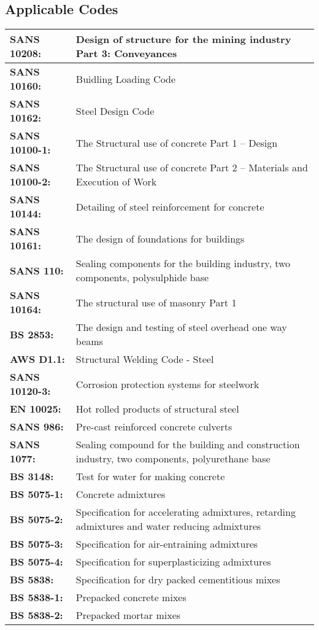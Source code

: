 \documentclass{article}%
\begin{document}
\subsection{Applicable Codes}%
\label{subsec:ApplicableCodes}%
\begin{flushleft}%
\begin{minipage}{\textwidth}%
\flushleft%
\begin{tabular}{|l |l |}%
\hline%
\textbf{SANS 10208:}&Design of structure for the mining industry Part 3: Conveyances\\%
\hline%
\textbf{SANS 10160:}&Buidling Loading Code\\%
\hline%
\textbf{SANS 10162:}&Steel Design Code\\%
\hline%
\textbf{SANS 10100{-}1:}&The Structural use of concrete Part 1 – Design\\%
\hline%
\textbf{SANS 10100{-}2:}&The Structural use of concrete Part 2 – Materials and Execution of Work\\%
\hline%
\textbf{SANS 10144:}&Detailing of steel reinforcement for concrete\\%
\hline%
\textbf{SANS 10161:}&The design of foundations for buildings\\%
\hline%
\textbf{SANS 110:}&Sealing components for the building industry, two components, polysulphide base\\%
\hline%
\textbf{SANS 10164:}&The structural use of masonry Part 1\\%
\hline%
\textbf{BS 2853:}&The design and testing of steel overhead one way beams\\%
\hline%
\textbf{AWS D1.1:}&Structural Welding Code {-} Steel\\%
\hline%
\textbf{SANS 10120{-}3:}&Corrosion protection systems for steelwork\\%
\hline%
\textbf{EN 10025:}&Hot rolled products of structural steel\\%
\hline%
\textbf{SANS 986:}&Pre{-}cast reinforced concrete culverts\\%
\hline%
\textbf{SANS 1077:}&Sealing compound for the building and construction industry, two components, polyurethane base\\%
\hline%
\textbf{BS 3148:}&Test for water for making concrete\\%
\hline%
\textbf{BS 5075{-}1:}&Concrete admixtures\\%
\hline%
\textbf{BS 5075{-}2:}&Specification for accelerating admixtures, retarding admixtures and water reducing admixtures\\%
\hline%
\textbf{BS 5075{-}3:}&Specification for air{-}entraining admixtures\\%
\hline%
\textbf{BS 5075{-}4:}&Specification for superplasticizing admixtures\\%
\hline%
\textbf{BS 5838:}&Specification for dry packed cementitious mixes\\%
\hline%
\textbf{BS 5838{-}1:}&Prepacked concrete mixes\\%
\hline%
\textbf{BS 5838{-}2:}&Prepacked mortar mixes\\%
\hline%
\end{tabular}%
\end{minipage}%
\end{flushleft}
\end{document}
